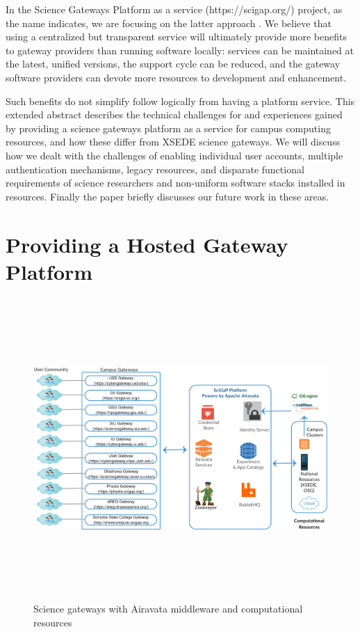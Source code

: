 \documentclass[sigconf]{acmart}
\begin{document}
In the Science Gateways Platform as a service (https://scigap.org/) project, as the name indicates, we are focusing on the latter approach \cite{pierce2015patching}. We believe that using a centralized but transparent service will ultimately provide more benefits to gateway providers than running software locally: services can be maintained at the latest, unified versions, the support cycle can be reduced, and the gateway software providers can devote more resources to development and enhancement.

Such benefits do not simplify follow logically from having a platform service. This extended abstract describes the technical challenges for and experiences gained by providing a science gateways platform as a service for campus computing resources, and how these differ from XSEDE science gateways. We will discuss how we dealt with the challenges of enabling individual user accounts, multiple authentication mechanisms, legacy resources, and disparate functional requirements of science researchers and non-uniform software stacks installed in resources. Finally the paper briefly discusses our future work in these areas.

\section{Providing a Hosted Gateway Platform}
\begin{figure}
\includegraphics[height=4.5in, width=7in]{figures/gateway_deployments.pdf}
\caption{Science gateways with Airavata middleware and computational resources}
\end{figure}
\end{document}
